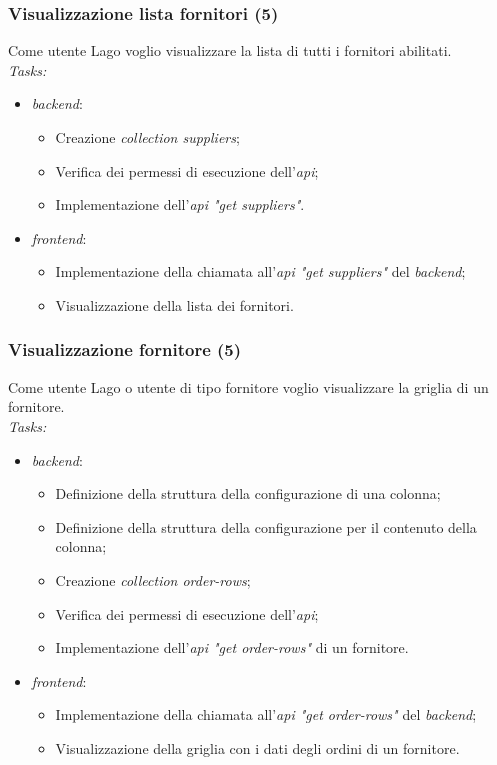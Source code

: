 \subsubsection{Visualizzazione lista fornitori (5)}
Come utente Lago voglio visualizzare la lista di tutti i fornitori abilitati. \\
\emph{Tasks:}
\begin{itemize}
  \item \emph{\Gls{backend}}:
    \begin{itemize}
      \item Creazione \emph{collection suppliers};
      \item Verifica dei permessi di esecuzione dell'\emph{\acrshort{api}};
      \item Implementazione dell'\emph{\acrshort{api} "get suppliers"}.
    \end{itemize}
  \item \emph{\Gls{frontend}}:
    \begin{itemize}
      \item Implementazione della chiamata all'\emph{\acrshort{api} "get suppliers"} del \emph{\gls{backend}};
      \item Visualizzazione della lista dei fornitori.
    \end{itemize}
\end{itemize}

\subsubsection{Visualizzazione fornitore (5)}
Come utente Lago o utente di tipo fornitore voglio visualizzare la griglia di un fornitore. \\
\emph{Tasks:}
\begin{itemize}
  \item \emph{\Gls{backend}}:
    \begin{itemize}
      \item Definizione della struttura della configurazione di una colonna;
      \item Definizione della struttura della configurazione per il contenuto della colonna;
      \item Creazione \emph{collection order-rows};
      \item Verifica dei permessi di esecuzione dell'\emph{\acrshort{api}};
      \item Implementazione dell'\emph{\acrshort{api} "get order-rows"} di un fornitore.
    \end{itemize}
  \item \emph{\Gls{frontend}}:
    \begin{itemize}
      \item Implementazione della chiamata all'\emph{\acrshort{api} "get order-rows"} del \emph{\gls{backend}};
      \item Visualizzazione della griglia con i dati degli ordini di un fornitore.
    \end{itemize}
\end{itemize}


